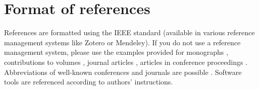 \documentclass[a4paper,11pt,twocolumn]{article}
\begin{document}
\section{Format of references}

References are formatted using the IEEE standard (available in various reference management systems like Zotero or Mendeley). If you do not use a reference management system, please use the examples provided for monographs \cite{Fant:1960}, contributions to volumes \cite{Stevens:1999}, journal articles \cite{Beattie/etal:1982}, articles in conference proceedings \cite{Ladefoged:2003}. Abbreviations of
well-known conferences and journals are possible \cite{Peterson/Barney:1952}. Software tools \cite{Boril/Skarnitzl:2016} are referenced according to authors' instructions. 




\theendnotes
\end{document}

